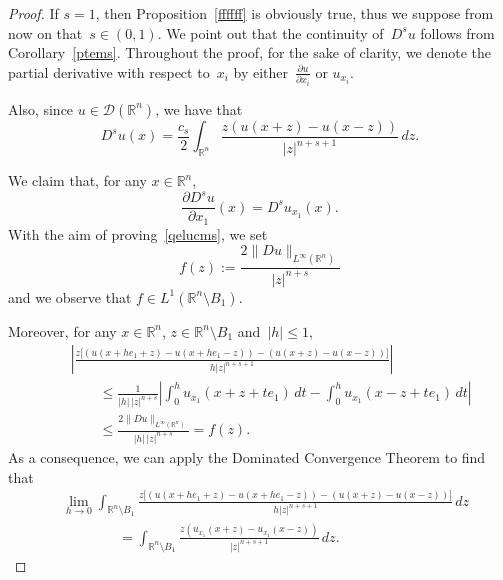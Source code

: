 \documentclass[11pt,hyp,]{nyjm}
\numberwithin{equation}{section}
\newcommand{\R}{\mathbb{R}}
\theoremstyle{remark}
\renewcommand{\leq}{\leqslant}
\renewcommand{\le}{\leqslant}
\begin{document}
\begin{proof}
If $s=1$, then Proposition~\ref{ffffff} is obviously true, thus we suppose from now on that~$s \in (0,1)$.
We point out that the continuity of~$D^su$ follows from Corollary~\ref{ptems}.
Throughout the proof, for the sake of clarity, we denote the partial derivative with respect to~$x_i$ by either~$\frac{\partial u}{\partial x_i}$ or $u_{x_i}$. 

Also, since $u \in \mathcal{D}(\R^n)$, we have that
\[ D^s u(x) = \frac{c_s}{2} \int_{\R^n}  \frac{z(u(x+z)-u(x-z))}{|z|^{n+s+1}} \, dz. \]

We claim that, for any $ x \in \R^n$,
\begin{equation}\label{qelucms}
\frac{\partial D^s u}{\partial x_1}(x)  = D^s u_{x_1}(x) .
\end{equation}
With the aim of proving~\eqref{qelucms}, we set
 \[ f(z):=\frac{2\|Du \|_{L^{\infty}(\R^n)}}{|z|^{n+s}}\]
 and we observe that $f \in L^1(\R^n \setminus B_1)$.
 
Moreover, for any $x \in \R^n$,
$z \in \R^n \setminus B_1$ and~$|h|\leq 1$,
\begin{eqnarray*}&&
\left|\frac{z \big[(u (x+ h e_1+z) - u (x+ h e_1-z))-(u(x+z)-u(x-z))\big]}{h |z|^{n+s+1}} \right| \\
&&\qquad\le\frac1{|h|\,|z|^{n+s}}\left| \int_0^h u_{x_1}(x+z+te_1)\,dt-\int_0^h u_{x_1}(x-z+te_1)\,dt\right|\\
&&\qquad\le\frac{2\|Du \|_{L^{\infty}(\R^n)}}{|h|\,|z|^{n+s}}= f(z).
\end{eqnarray*}
As a consequence, we can apply the Dominated Convergence Theorem to find that
 \begin{equation}\label{qelpcms}
\begin{split}
&\lim_{h \to 0} \int_{\R^n\setminus B_1} \frac{z \big[(u (x+ h e_1+z) - u (x+ h e_1-z))-(u(x+z)-u(x-z))\big]}{h |z|^{n+s+1}} \, dz \\
&\qquad\qquad=  \int_{\R^n\setminus B_1} \frac{z \left( u_{ x_1} (x+ z) - u_{ x_1 }  (x-z)\right)}{|z|^{n+s+1}} \, dz .
\end{split}
\end{equation}


\end{proof}
\end{document}
